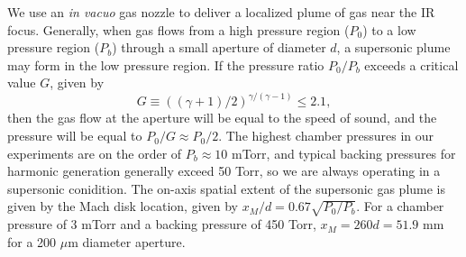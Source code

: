We use an \textit{in vacuo} gas nozzle to deliver a localized plume of gas near the IR focus. Generally, when gas flows from a high pressure region ($P_0$) to a low pressure region ($P_b$) through a small aperture of diameter $d$, a supersonic plume may form in the low pressure region. If the pressure ratio $P_0/P_b$ exceeds a critical value $G$, given by
\begin{equation}
G \equiv ((\gamma+1)/2)^{\gamma/(\gamma-1)} \le 2.1,
\label{eqn:G_factor}
\end{equation}
then the gas flow at the aperture will be equal to the speed of sound, and the pressure will be equal to $P_0 / G \approx P_0/2$. The highest chamber pressures in our experiments are on the order of $P_b \approx 10$ mTorr, and typical backing pressures for harmonic generation generally exceed 50 Torr, so we are always operating in a supersonic conidition. The on-axis spatial extent of the supersonic gas plume is given by the Mach disk location, given by $x_M / d = 0.67 \sqrt{P_0/P_b}$. For a chamber pressure of 3 mTorr and a backing pressure of 450 Torr, $x_M = 260d = 51.9$ mm for a 200 $\mu$m diameter aperture.

